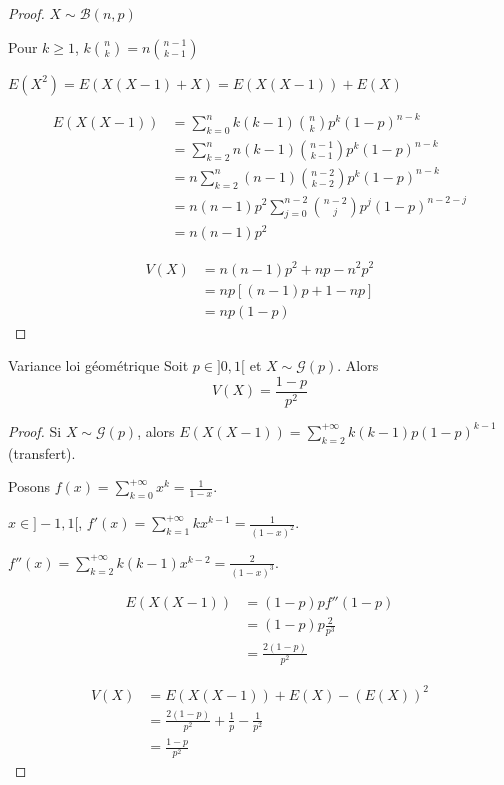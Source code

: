 \begin{proof}
    $X \sim \mathcal B(n, p)$

    Pour $k \geqslant 1$, $\displaystyle k \binom n k = n \binom{n - 1}{k - 1}$

    $E(X^2) = E(X(X - 1) + X) = E(X(X - 1)) + E(X)$

    \begin{align}
        E(X(X - 1)) & = \sum_{k = 0}^n k (k - 1) \binom n k p^k (1 - p)^{n - k} \\
        & = \sum_{k = 2}^n n (k - 1) \binom {n - 1}{k - 1} p^k (1 - p)^{n - k} \\
        & = n \sum_{k = 2 }^{n } (n - 1) \binom{n - 2}{k - 2} p^k (1 - p)^{n - k} \\
        & = n (n - 1) p^2 \sum_{j = 0}^{n - 2} \binom{n - 2}{j} p^j (1 - p)^{n - 2 - j} \\
        & = n (n - 1) p^2
    \end{align}

    \begin{align}
        V(X) & = n(n - 1) p^2 + np - n^2 p^2 \\
        & = n p [(n - 1) p + 1 - n p] \\
        & = n p (1 - p)
    \end{align}
\end{proof}

\begin{proposition}{Variance loi géométrique}{}
    Soit $p \in ]0, 1[$ et $X \sim \mathcal G(p)$. Alors 
    $$ V(X) = \frac{1 - p}{p^2} $$
\end{proposition}

\begin{proof}
    Si $X \sim \mathcal G(p)$, alors
    $E(X(X - 1)) = \displaystyle \sum_{k = 2}^{+ \infty} k (k - 1) p (1 - p)^{k - 1}$ (transfert).

    Posons $\displaystyle f(x) = \sum_{k = 0}^{+ \infty} x^k = \frac 1 {1 - x}$.

    $x \in ]-1, 1[$, $f'(x) = \displaystyle \sum_{k = 1}^{+ \infty} k x^{k - 1} = \frac 1 {(1 - x)^2}$.

    $f''(x) = \displaystyle \sum_{k = 2}^{+ \infty} k (k - 1) x^{k - 2} = \frac 2 {(1 - x)^3}$.

    \begin{align}
        E(X(X - 1)) & = (1 - p) p f''(1 - p) \\
        & = (1 - p) p \frac 2 {p^3} \\
        & = \frac{2 (1 - p)}{p^2}
    \end{align}

    \begin{align}
        V(X) & = E(X(X - 1)) + E(X) - (E(X))^2 \\
        & = \frac{2 (1 - p)}{p^2} + \frac 1 p - \frac 1 {p^2} \\
        & = \frac{1 - p}{p^2}
    \end{align}
\end{proof}

